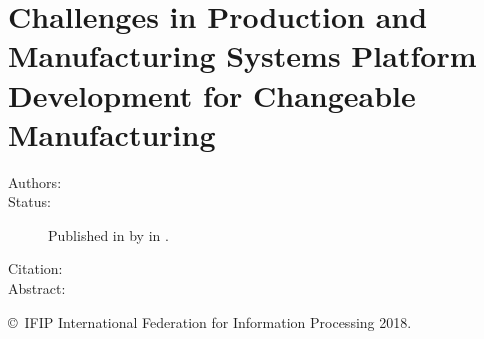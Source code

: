 \chapter[Challenges in Production Platform Development]{Challenges in Production and Manufacturing Systems Platform Development for Changeable Manufacturing}\label{paper:APMS2018}
\setcounter{page}{85}

\begin{description}
  \item[Authors:]
  \item[Status:] Published in \citeyear{SorensenAPMS2018} by  in .
  \item[Citation:]
  \item[Abstract:] 
\end{description}

\vfill
\noindent\copyright~IFIP International Federation for Information Processing 2018.

% 